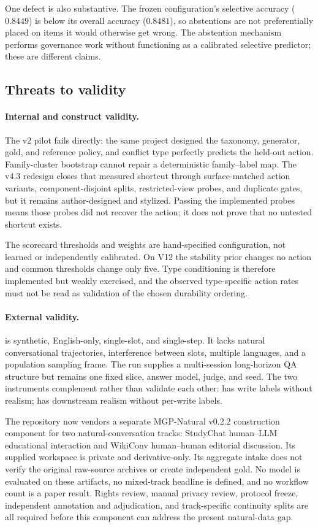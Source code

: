 One defect is also substantive. The frozen \mgpc{} configuration's selective
accuracy ($0.8449$) is below its overall accuracy ($0.8481$), so abstentions are
not preferentially placed on items it would otherwise get wrong. The
abstention mechanism performs governance work without functioning as a
calibrated selective predictor; these are different claims.

\subsection{Threats to validity}

\paragraph{Internal and construct validity.}
The v2 pilot fails directly: the same project designed the taxonomy, generator,
gold, and reference policy, and conflict type perfectly predicts the held-out
action. Family-cluster bootstrap cannot repair a deterministic
family--label map. The v4.3 redesign closes that measured shortcut through
surface-matched action variants, component-disjoint splits, restricted-view
probes, and duplicate gates, but it remains author-designed and stylized.
Passing the implemented probes means those probes did not recover the action;
it does not prove that no untested shortcut exists.

The scorecard thresholds and weights are hand-specified configuration, not
learned or independently calibrated. On V12 the stability prior changes no
action and common thresholds change only five. Type conditioning is therefore
implemented but weakly exercised, and the observed type-specific action rates
must not be read as validation of the chosen durability ordering.

\paragraph{External validity.}
\mgpc{} is synthetic, English-only, single-slot, and single-step. It lacks
natural conversational trajectories, interference between slots, multiple
languages, and a population sampling frame. The \lme{} run supplies a
multi-session long-horizon QA structure but remains one fixed slice, answer
model, judge, and
seed. The two instruments complement rather than validate each other:
\mgpc{} has write labels without realism; \lme{} has downstream realism without
per-write labels.

The repository now vendors a separate MGP-Natural v0.2.2 construction
component for two natural-conversation tracks: StudyChat human--LLM educational
interaction and WikiConv human--human editorial discussion. Its supplied
workspace is private and derivative-only. Its aggregate intake does not verify
the original raw-source archives or create independent gold. No model is
evaluated on these artifacts, no mixed-track headline is defined, and no
workflow count is a paper result. Rights review, manual privacy review,
protocol freeze, independent annotation and adjudication, and track-specific
continuity splits are all required before this component can address the
present natural-data gap.

